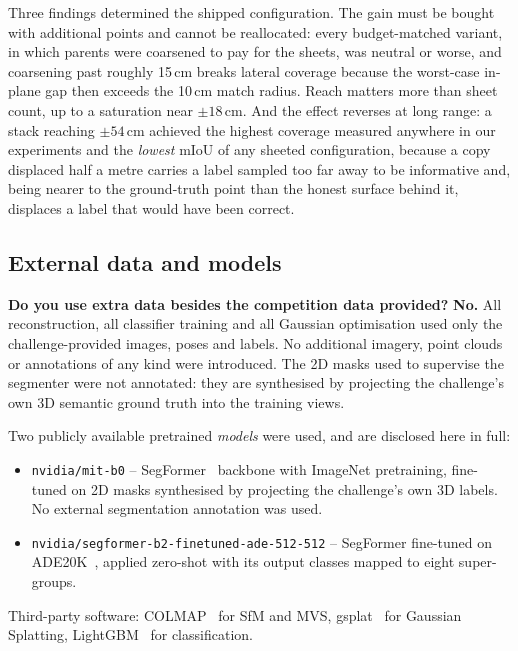 \documentclass[10pt,twocolumn,letterpaper]{article}
\begin{document}
Three findings determined the shipped configuration. The gain must be bought
with additional points and cannot be reallocated: every budget-matched variant,
in which parents were coarsened to pay for the sheets, was neutral or worse, and
coarsening past roughly 15\,cm breaks lateral coverage because the worst-case
in-plane gap then exceeds the 10\,cm match radius. Reach matters more than sheet
count, up to a saturation near $\pm18$\,cm. And the effect reverses at long
range: a stack reaching $\pm54$\,cm achieved the highest coverage measured
anywhere in our experiments and the \emph{lowest} mIoU of any sheeted
configuration, because a copy displaced half a metre carries a label sampled too
far away to be informative and, being nearer to the ground-truth point than the
honest surface behind it, displaces a label that would have been correct.

\subsection{External data and models}

\textbf{Do you use extra data besides the competition data provided?}
\textbf{No.} All reconstruction, all classifier training and all Gaussian
optimisation used only the challenge-provided images, poses and labels. No
additional imagery, point clouds or annotations of any kind were introduced.
The 2D masks used to supervise the segmenter were not annotated: they are
synthesised by projecting the challenge's own 3D semantic ground truth into the
training views.

Two publicly available pretrained \emph{models} were used, and are disclosed
here in full:

\begin{itemize}\itemsep2pt
\item \texttt{nvidia/mit-b0} -- SegFormer~\cite{xie2021segformer} backbone with
ImageNet pretraining, fine-tuned on 2D masks synthesised by projecting the
challenge's own 3D labels. No external segmentation annotation was used.
\item \texttt{nvidia/segformer-b2-finetuned-ade-512-512} -- SegFormer fine-tuned
on ADE20K~\cite{zhou2017ade20k}, applied zero-shot with its output classes
mapped to eight super-groups.
\end{itemize}

Third-party software: COLMAP~\cite{schoenberger2016sfm} for SfM and MVS,
gsplat~\cite{ye2024gsplat} for Gaussian Splatting, LightGBM~\cite{ke2017lightgbm}
for classification.
\end{document}
